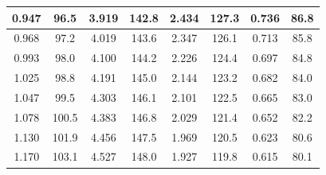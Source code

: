 \documentclass[a4paper,12pt,titlepage]{article}
\begin{document}
\begin{table}[]
\begin{tabular}{|cccccccc}
\multicolumn{1}{|c|}{0.947}       & \multicolumn{1}{c|}{96.5}               & \multicolumn{1}{c|}{3.919}       & \multicolumn{1}{c|}{142.8}              & \multicolumn{1}{c|}{2.434}       & \multicolumn{1}{c|}{127.3}              & \multicolumn{1}{c|}{0.736}       & \multicolumn{1}{c|}{86.8}               \\ \hline
\multicolumn{1}{|c|}{0.968}       & \multicolumn{1}{c|}{97.2}               & \multicolumn{1}{c|}{4.019}       & \multicolumn{1}{c|}{143.6}              & \multicolumn{1}{c|}{2.347}       & \multicolumn{1}{c|}{126.1}              & \multicolumn{1}{c|}{0.713}       & \multicolumn{1}{c|}{85.8}               \\ \hline
\multicolumn{1}{|c|}{0.993}       & \multicolumn{1}{c|}{98.0}               & \multicolumn{1}{c|}{4.100}       & \multicolumn{1}{c|}{144.2}              & \multicolumn{1}{c|}{2.226}       & \multicolumn{1}{c|}{124.4}              & \multicolumn{1}{c|}{0.697}       & \multicolumn{1}{c|}{84.8}               \\ \hline
\multicolumn{1}{|c|}{1.025}       & \multicolumn{1}{c|}{98.8}               & \multicolumn{1}{c|}{4.191}       & \multicolumn{1}{c|}{145.0}              & \multicolumn{1}{c|}{2.144}       & \multicolumn{1}{c|}{123.2}              & \multicolumn{1}{c|}{0.682}       & \multicolumn{1}{c|}{84.0}               \\ \hline
\multicolumn{1}{|c|}{1.047}       & \multicolumn{1}{c|}{99.5}               & \multicolumn{1}{c|}{4.303}       & \multicolumn{1}{c|}{146.1}              & \multicolumn{1}{c|}{2.101}       & \multicolumn{1}{c|}{122.5}              & \multicolumn{1}{c|}{0.665}       & \multicolumn{1}{c|}{83.0}               \\ \hline
\multicolumn{1}{|c|}{1.078}       & \multicolumn{1}{c|}{100.5}              & \multicolumn{1}{c|}{4.383}       & \multicolumn{1}{c|}{146.8}              & \multicolumn{1}{c|}{2.029}       & \multicolumn{1}{c|}{121.4}              & \multicolumn{1}{c|}{0.652}       & \multicolumn{1}{c|}{82.2}               \\ \hline
\multicolumn{1}{|c|}{1.130}       & \multicolumn{1}{c|}{101.9}              & \multicolumn{1}{c|}{4.456}       & \multicolumn{1}{c|}{147.5}              & \multicolumn{1}{c|}{1.969}       & \multicolumn{1}{c|}{120.5}              & \multicolumn{1}{c|}{0.623}       & \multicolumn{1}{c|}{80.6}               \\ \hline
\multicolumn{1}{|c|}{1.170}       & \multicolumn{1}{c|}{103.1}              & \multicolumn{1}{c|}{4.527}       & \multicolumn{1}{c|}{148.0}              & \multicolumn{1}{c|}{1.927}       & \multicolumn{1}{c|}{119.8}              & \multicolumn{1}{c|}{0.615}       & \multicolumn{1}{c|}{80.1}               \\ \hline

\end{tabular}
\end{table}
\end{document}
